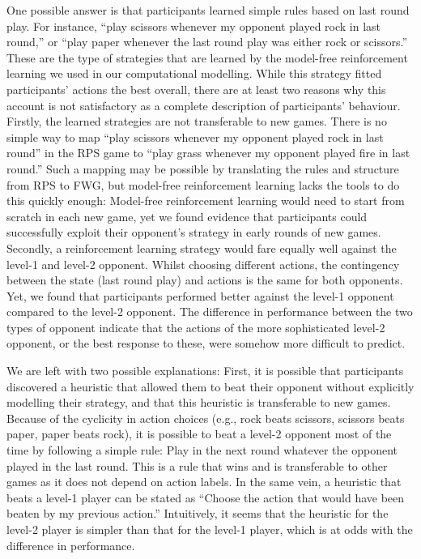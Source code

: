 \documentclass[
  english,
  man,floatsintext]{apa6}
\begin{document}
One possible answer is that participants learned simple rules based on last round play. For instance, ``play scissors whenever my opponent played rock in last round,'' or ``play paper whenever the last round play was either rock or scissors.'' These are the type of strategies that are learned by the model-free reinforcement learning we used in our computational modelling. While this strategy fitted participants' actions the best overall, there are at least two reasons why this account is not satisfactory as a complete description of participants' behaviour. Firstly, the learned strategies are not transferable to new games. There is no simple way to map ``play scissors whenever my opponent played rock in last round'' in the RPS game to ``play grass whenever my opponent played fire in last round.'' Such a mapping may be possible by translating the rules and structure from RPS to FWG, but model-free reinforcement learning lacks the tools to do this quickly enough: Model-free reinforcement learning would need to start from scratch in each new game, yet we found evidence that participants could successfully exploit their opponent's strategy in early rounds of new games. Secondly, a reinforcement learning strategy would fare equally well against the level-1 and level-2 opponent. Whilst choosing different actions, the contingency between the state (last round play) and actions is the same for both opponents. Yet, we found that participants performed better against the level-1 opponent compared to the level-2 opponent. The difference in performance between the two types of opponent indicate that the actions of the more sophisticated level-2 opponent, or the best response to these, were somehow more difficult to predict.

We are left with two possible explanations: First, it is possible that participants discovered a heuristic that allowed them to beat their opponent without explicitly modelling their strategy, and that this heuristic is transferable to new games. Because of the cyclicity in action choices (e.g., rock beats scissors, scissors beats paper, paper beats rock), it is possible to beat a level-2 opponent most of the time by following a simple rule: Play in the next round whatever the opponent played in the last round. This is a rule that wins and is transferable to other games as it does not depend on action labels. In the same vein, a heuristic that beats a level-1 player can be stated as ``Choose the action that would have been beaten by my previous action.'' Intuitively, it seems that the heuristic for the level-2 player is simpler than that for the level-1 player, which is at odds with the difference in performance.
\end{document}
